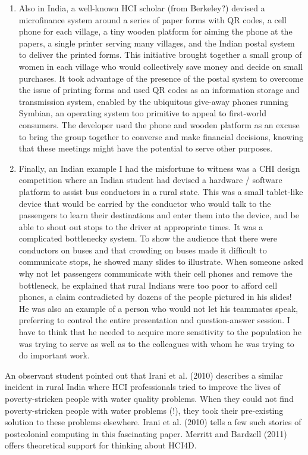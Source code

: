 \begin{enumerate}
\def\labelenumi{(\arabic{enumi})}
\setcounter{enumi}{2}
\item
  Also in India, a well-known HCI scholar (from Berkeley?) devised a
  microfinance system around a series of paper forms with QR codes, a
  cell phone for each village, a tiny wooden platform for aiming the
  phone at the papers, a single printer serving many villages, and the
  Indian postal system to deliver the printed forms. This initiative
  brought together a small group of women in each village who would
  collectively save money and decide on small purchases. It took
  advantage of the presence of the postal system to overcome the issue
  of printing forms and used QR codes as an information storage and
  transmission system, enabled by the ubiquitous give-away phones
  running Symbian, an operating system too primitive to appeal to
  first-world consumers. The developer used the phone and wooden
  platform as an excuse to bring the group together to converse and make
  financial decisions, knowing that these meetings might have the
  potential to serve other purposes.
\item
  Finally, an Indian example I had the misfortune to witness was a CHI
  design competition where an Indian student had devised a hardware /
  software platform to assist bus conductors in a rural state. This was
  a small tablet-like device that would be carried by the conductor who
  would talk to the passengers to learn their destinations and enter
  them into the device, and be able to shout out stops to the driver at
  appropriate times. It was a complicated bottlenecky system. To show
  the audience that there were conductors on buses and that crowding on
  buses made it difficult to communicate stops, he showed many slides to
  illustrate. When someone asked why not let passengers communicate with
  their cell phones and remove the bottleneck, he explained that rural
  Indians were too poor to afford cell phones, a claim contradicted by
  dozens of the people pictured in his slides! He was also an example of
  a person who would not let his teammates speak, preferring to control
  the entire presentation and question-answer session. I have to think
  that he needed to acquire more sensitivity to the population he was
  trying to serve as well as to the colleagues with whom he was trying
  to do important work.
\end{enumerate}

An observant student pointed out that Irani et al. (2010) describes a
similar incident in rural India where HCI professionals tried to improve
the lives of poverty-stricken people with water quality problems. When
they could not find poverty-stricken people with water problems (!),
they took their pre-existing solution to these problems elsewhere. Irani
et al. (2010) tells a few such stories of postcolonial computing in this
fascinating paper. Merritt and Bardzell (2011) offers theoretical
support for thinking about HCI4D.

